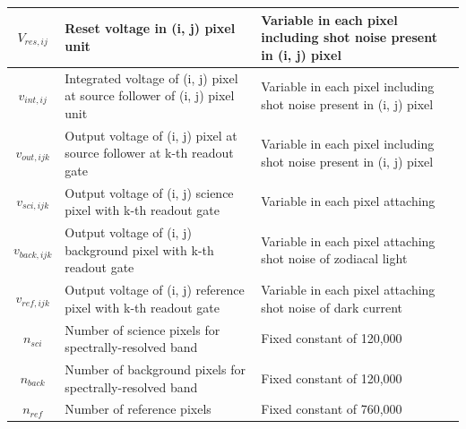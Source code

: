 \documentclass{aastex62}
\begin{document}
\begin{longtable}[H]{|c|p{7cm}|p{7cm}|}
$V_{res,ij}$ & Reset voltage in (i, j) pixel unit & Variable in each pixel including shot noise present in (i, j) pixel \\ \hline
$v_{int,ij}$ & Integrated voltage of (i, j) pixel at source follower of (i, j) pixel unit & Variable in each pixel including shot noise present in (i, j) pixel \\ \hline
$v_{out,ijk}$ & Output voltage of (i, j) pixel at source follower at k-th readout gate & Variable in each pixel including shot noise present in (i, j) pixel \\ \hline
$v_{sci,ijk}$ & Output voltage of (i, j) science pixel with k-th readout gate & Variable in each pixel attaching \\ \hline
$v_{back,ijk}$ & Output voltage of (i, j) background pixel with k-th readout gate & Variable in each pixel attaching shot noise of zodiacal light \\ \hline
$v_{ref,ijk}$ & Output voltage of (i, j) reference pixel with k-th readout gate & Variable in each pixel attaching shot noise of dark current \\ \hline
$n_{sci}$ & Number of science pixels for spectrally-resolved band & Fixed constant of 120,000 \\ \hline
$n_{back}$ & Number of background pixels for spectrally-resolved band & Fixed constant of 120,000 \\ \hline
$n_{ref}$ & Number of reference pixels & Fixed constant of 760,000 \\ \hline
\end{longtable}
\end{document}

